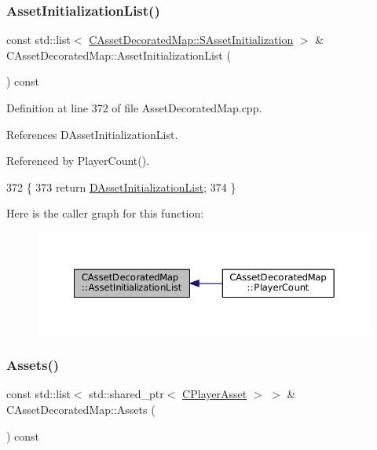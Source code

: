 \subsubsection{\texorpdfstring{Asset\+Initialization\+List()}{AssetInitializationList()}}
{\footnotesize\ttfamily const std\+::list$<$ \hyperlink{structCAssetDecoratedMap_1_1SAssetInitialization}{C\+Asset\+Decorated\+Map\+::\+S\+Asset\+Initialization} $>$ \& C\+Asset\+Decorated\+Map\+::\+Asset\+Initialization\+List (\begin{DoxyParamCaption}{ }\end{DoxyParamCaption}) const}



Definition at line 372 of file Asset\+Decorated\+Map.\+cpp.



References D\+Asset\+Initialization\+List.



Referenced by Player\+Count().


\begin{DoxyCode}
372                                                                                                           \{
373     \textcolor{keywordflow}{return} \hyperlink{classCAssetDecoratedMap_a2b7bf2e9a19a9173093cef32048608c2}{DAssetInitializationList};
374 \}
\end{DoxyCode}
Here is the caller graph for this function\+:\nopagebreak
\begin{figure}[H]
\begin{center}
\leavevmode
\includegraphics[width=350pt]{classCAssetDecoratedMap_aa71f42e162c1d3003248306bfa15e69d_icgraph}
\end{center}
\end{figure}
\hypertarget{classCAssetDecoratedMap_a2f4d2597697593197567877900d55c52}{}\label{classCAssetDecoratedMap_a2f4d2597697593197567877900d55c52} 
\subsubsection{\texorpdfstring{Assets()}{Assets()}}
{\footnotesize\ttfamily const std\+::list$<$ std\+::shared\+\_\+ptr$<$ \hyperlink{classCPlayerAsset}{C\+Player\+Asset} $>$ $>$ \& C\+Asset\+Decorated\+Map\+::\+Assets (\begin{DoxyParamCaption}{ }\end{DoxyParamCaption}) const}



